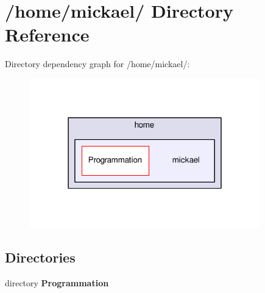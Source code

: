 \section{/home/mickael/ Directory Reference}
\label{dir_d3e9777cce5619ba9d88e8fa9f8233b4}
Directory dependency graph for /home/mickael/\-:\nopagebreak
\begin{figure}[H]
\begin{center}
\leavevmode
\includegraphics[width=284pt]{dir_d3e9777cce5619ba9d88e8fa9f8233b4_dep}
\end{center}
\end{figure}
\subsection*{Directories}
\begin{DoxyCompactItemize}
\item 
directory {\bf Programmation}
\end{DoxyCompactItemize}
